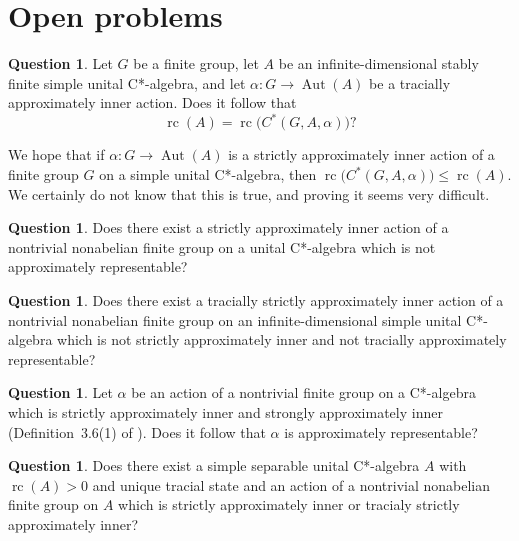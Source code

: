 \documentclass[10pt]{amsart}
\numberwithin{equation}{section}
\theoremstyle{definition}
\newtheorem{qst}[thm]{Question}
\newcommand{\af}{\alpha}
\newcommand{\Aut}{{\operatorname{Aut}}}
\newcommand{\rc}{{\operatorname{rc}}}
\newcommand{\ca}{C*-algebra}
\newcommand{\CGAa}{C^* (G, A, \af)}
\begin{document}
\section{Open problems}\label{Sec_Open_Problems}
\begin{qst}\label{Q_1_eq}
Let $G$ be a finite group,
let $A$ be
an infinite-dimensional stably finite simple unital C*-algebra,
and let $\alpha \colon G \to \Aut (A)$ be a tracially approximately inner action.
Does it follow that
\[
\rc (A) = \rc \big( \CGAa \big)?
\]

We hope that if $\alpha \colon G \to \Aut (A)$ is a strictly approximately inner action 
of a finite group $G$ on a simple unital C*-algebra, then
$\rc \big( \CGAa \big) \leq \rc (A)$.
We certainly do not know that this is true, and proving it seems very
difficult.
\end{qst}
%
\begin{qst}\label{Q_2_TrivOnTA}
Does there exist a  strictly approximately inner action of a nontrivial nonabelian finite group
 on a unital \ca{} which is not approximately representable?
\end{qst}
%
\begin{qst}\label{Q_3_TrivOnTA}
Does there exist a  tracially strictly approximately inner action of a nontrivial nonabelian finite group
 on an infinite-dimensional simple unital \ca{}  which is not strictly approximately inner and not tracially approximately representable?
\end{qst}
%
\begin{qst}\label{Q_3_TrivOnTA}
Let $\alpha$ be an action of a nontrivial finite group on a C*-algebra 
which is strictly approximately inner and strongly approximately inner (Definition~3.6(1) of \cite{Iz1}).
Does it follow that $\alpha$ is approximately representable?
\end{qst}
%
\begin{qst}\label{Q_9412_UniqTr}
Does there exist a simple separable unital \ca{} $A$ with  $\rc (A) > 0$ and unique tracial state and 
 an action of a nontrivial nonabelian finite group on $A$ 
which is strictly  approximately inner or tracialy strictly  approximately inner?
\end{qst}
\end{document}

